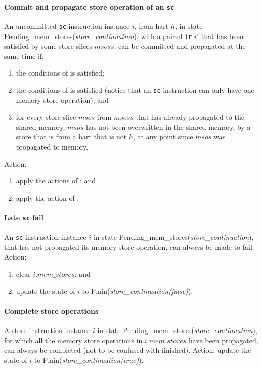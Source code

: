 \paragraph{Commit and propagate store operation of an {\tt sc}}\label{omm:commit_sc}
An uncommitted {\tt sc} instruction instance $i$, from hart $h$, in state {\sc Pending\_mem\_stores}({\it store\_continuation}), with a paired {\tt lr} $i'$ that has been satisfied by some store slices $msoss$, can be committed and propagated at the same time if:
\begin{enumerate}
\item the conditions of  is satisfied;
\item the conditions of  is satisfied (notice that an {\tt sc} instruction can only have one memory store operation); and
\item for every store slice $msos$ from $msoss$ that has already propagated to the shared memory, $msos$ has not been overwritten in the shared memory, by a store that is from a hart that is not $h$, at any point since $msos$ was propagated to memory.
\end{enumerate}
Action:
\begin{enumerate}
\item apply the actions of ; and
\item apply the action of .
\end{enumerate}


\paragraph{Late {\tt sc} fail}\label{omm:late_sc_fail}
An {\tt sc} instruction instance $i$ in state {\sc Pending\_mem\_stores}({\it store\_continuation}), that has not propagated its memory store operation, can always be made to fail.
Action:
\begin{enumerate}
\item clear $i.\textit{mem\_stores}$; and
\item update the state of $i$ to {\sc Plain}({\it store\_continuation(false)}).
\end{enumerate}


\paragraph{Complete store operations}\label{omm:complete_stores}
A store instruction instance $i$ in state {\sc Pending\_mem\_stores}({\it store\_continuation}), for which all the memory store operations in $i.\textit{mem\_stores}$ have been propagated, can always be completed (not to be confused with finished).
Action: update the state of $i$ to {\sc Plain}({\it store\_continuation(true)}).


